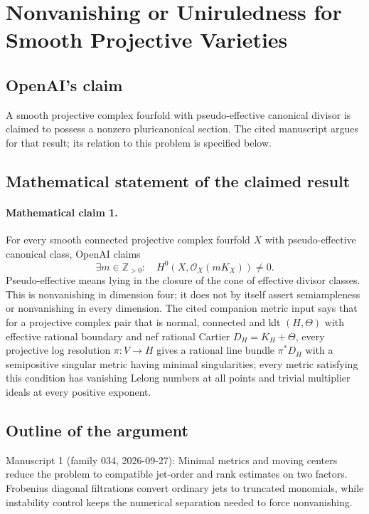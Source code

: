 \documentclass[11pt]{article}
\begin{document}
\section*{Nonvanishing or Uniruledness for Smooth Projective Varieties}

\subsection{OpenAI's claim}
A smooth projective complex fourfold with pseudo-effective canonical divisor is claimed to possess a nonzero pluricanonical section. The cited manuscript argues for that result; its relation to this problem is specified below.

\subsection{Mathematical statement of the claimed result}
\paragraph{Mathematical claim 1.} For every smooth connected projective complex fourfold $X$ with pseudo-effective canonical class, OpenAI claims
\[
\exists m\in\mathbb Z_{>0}:\quad H^0(X,\mathcal O_X(mK_X))\ne0.
\]
Pseudo-effective means lying in the closure of the cone of effective divisor classes. This is nonvanishing in dimension four; it does not by itself assert semiampleness or nonvanishing in every dimension.
The cited companion metric input says that for a projective complex pair that is normal, connected and klt $(H,\Theta)$ with effective rational boundary and nef rational Cartier $D_H=K_H+\Theta$, every projective log resolution $\pi:V\to H$ gives a rational line bundle $\pi^*D_H$ with a semipositive singular metric having minimal singularities; every metric satisfying this condition has vanishing Lelong numbers at all points and trivial multiplier ideals at every positive exponent.

\subsection{Outline of the argument}
Manuscript 1 (family 034, 2026-09-27): Minimal metrics and moving centers reduce the problem to compatible jet-order and rank estimates on two factors. Frobenius diagonal filtrations convert ordinary jets to truncated monomials, while instability control keeps the numerical separation needed to force nonvanishing.
\end{document}
